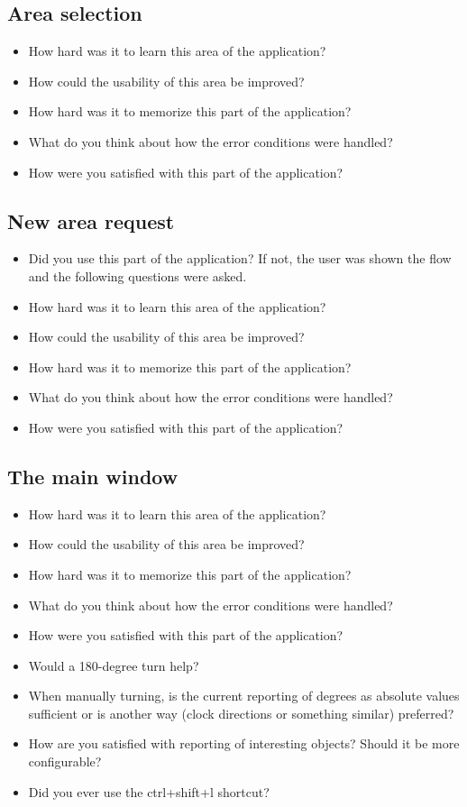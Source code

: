 \documentclass[nolof,digital]{fithesis3}
\begin{document}
\subsection{Area selection}
\begin{itemize}
\item How hard was it to learn this area of the application?
\item How could the usability of this area be improved?
\item How hard was it to memorize this part of the application?
\item What do you think about how the error conditions were handled?
\item How were you satisfied with this part of the application?
\end{itemize}
\subsection{New area request}
\begin{itemize}
\item Did you use this part of the application? If not, the user was shown the flow and the following questions were asked.
\item How hard was it to learn this area of the application?
\item How could the usability of this area be improved?
\item How hard was it to memorize this part of the application?
\item What do you think about how the error conditions were handled?
\item How were you satisfied with this part of the application?
\end{itemize}
\subsection{The main window}
\begin{itemize}
\item How hard was it to learn this area of the application?
\item How could the usability of this area be improved?
\item How hard was it to memorize this part of the application?
\item What do you think about how the error conditions were handled?
\item How were you satisfied with this part of the application?
\item Would a 180-degree turn help?
\item When manually turning, is the current reporting of degrees as absolute values sufficient or is another way (clock directions or something similar) preferred?
\item How are you satisfied with reporting of interesting objects? Should it be more configurable?
\item Did you ever use the ctrl+shift+l shortcut?
\end{itemize}
\end{document}
